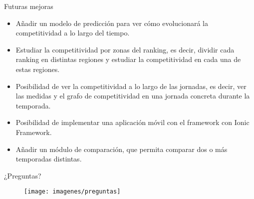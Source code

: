 \documentclass[10pt,hyperref={unicode}]{beamer}
\begin{document}
	\begin{frame}{Futuras mejoras}
		\begin{itemize}
			\item Añadir un modelo de predicción para ver cómo evolucionará la competitividad a lo largo del tiempo.
			
			\item Estudiar la competitividad por zonas del ranking, es decir, dividir cada ranking en distintas regiones y estudiar la competitividad en cada una de estas regiones. 
			
			\item Posibilidad de ver la competitividad a lo largo de las jornadas, es decir, ver las medidas y el grafo de competitividad en una jornada concreta durante la temporada.
			
			\item Posibilidad de implementar una aplicación móvil con el framework con Ionic Framework.
			
			\item Añadir un módulo de comparación, que permita comparar dos o más temporadas distintas.
			
		\end{itemize}
	\end{frame}
	
	
	\begin{frame}{¿Preguntas?}
		\begin{figure}
			\centering
			\texttt{[image: imagenes/preguntas]}
		\end{figure}

	\end{frame}
	
	
\end{document}
